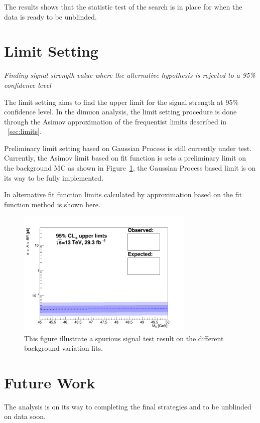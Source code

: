 The results shows that the statistic test of the search is in place for when the data is ready to be unblinded.

\section{Limit Setting}

\textit{Finding signal strength value where the alternative hypothesis is rejected to a 95\% confidence level}

The limit setting aims to find the upper limit for the signal strength at 95\% confidence level. In the dimuon analysis, the limit setting procedure is done through the Asimov approximation of the frequentist limits described in ~\ref{sec:limits}.

Preliminary limit setting based on Gaussian Process is still currently under test. Currently, the Asimov limit based on fit function is sets a preliminary limit on the background MC as shown in Figure~\ref{fig:limits}, the Gaussian Process based limit is on its way to be fully implemented. 

In alternative fit function limits calculated by approximation based on the fit function method is shown here.

\begin{figure}[!htb]
   \begin{center}
       \includegraphics[width=0.75\textwidth]{figures/chapter_dimuon/limits}
       \caption{
       This figure illustrate a spurious signal test result on the different background variation fits.}
        \label{fig:limits}
   \end{center}
\end{figure}

\section{Future Work}
The analysis is on its way to completing the final strategies and to be unblinded on data soon.




